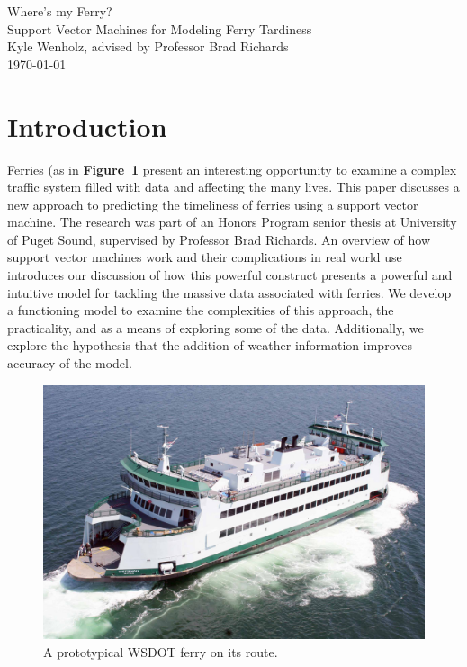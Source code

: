 \documentclass[11pt]{article} %
\begin{document}
\begin{titlepage}
    \vspace*{\fill}
    \begin{center}
      \Huge{Where's my Ferry?}\\[0.5cm]
      \Large{Support Vector Machines for Modeling Ferry Tardiness}\\[0.4cm]
      Kyle Wenholz, advised by Professor Brad Richards\\
      \today
    \end{center}
    \vspace*{\fill}
  \end{titlepage}
\newpage
\vspace*{\fill}
\tableofcontents
\vspace*{\fill}
\newpage

\section{Introduction}
\label{sec:intro}
Ferries (as in \textbf{Figure~\ref{fig:basicferry}} present an interesting 
opportunity to examine a complex traffic system filled with data and affecting 
the many lives. This paper discusses a new approach to predicting 
the timeliness of ferries using a support vector machine. The research was part
of an Honors Program senior thesis at University of Puget Sound, supervised by 
Professor Brad Richards. An overview of how 
support vector machines work and their complications in real world use 
introduces our discussion of how this powerful construct presents a powerful and 
intuitive model for tackling the massive data associated with ferries. We
develop a functioning model to examine the complexities of this
approach, the practicality, and as a means of exploring some of the data. 
Additionally, we explore the hypothesis that the addition of weather information 
improves accuracy of the model.

\begin{figure}[h]
  \centering
  \includegraphics[scale=.15]{images/ferry.jpg}
  \caption{A prototypical WSDOT ferry on its route.}
  \label{fig:basicferry}
\end{figure}
\end{document}
